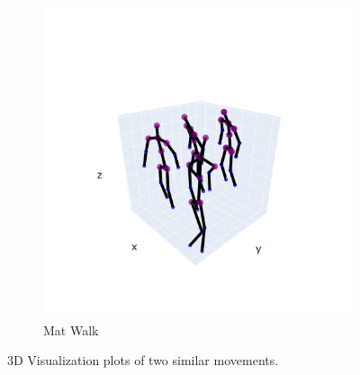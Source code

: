 \begin{figure}[h]
\begin{subfigure}{.5\textwidth}
                  \includegraphics[width=1.\linewidth]{../src/resources/plots/movements/mov-8.png}
                  \caption{Mat Walk}
                  \label{fig: mat-walk}
                \end{subfigure}
                \caption{3D Visualization plots of two similar movements.}
            \end{figure}

\cleardoublepage
